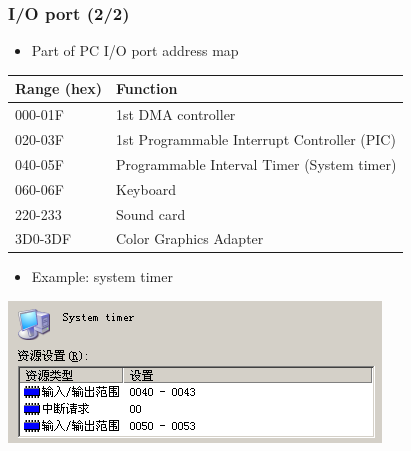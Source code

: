 \documentclass[CJKutf8,xcolor=pdftex,dvipsnames,table]{beamer}
\begin{document}
\begin{CJK*}{UTF8}{song}
  \begin{frame}
    \frametitle{I/O port (2/2)} \pause
    \begin{itemize}
    \item{Part of PC I/O port address map} \pause
    \end{itemize}
    \small
    \begin{center}
      \begin{tabular}{ll} \hline
        \textbf{Range (hex)} & \textbf{Function}\\[0.5ex] \hline\hline
        000-01F & 1st DMA controller\\ \hline
        020-03F & 1st Programmable Interrupt Controller (PIC)\\ \hline
        040-05F & Programmable Interval Timer (System timer)\\ \hline
        060-06F & Keyboard\\ \hline
        220-233 & Sound card\\ \hline
        3D0-3DF & Color Graphics Adapter\\ \hline
      \end{tabular} \pause
    \end{center}
    \normalsize
    \begin{itemize}
    \item{Example: system timer} \pause
    \end{itemize}
    \begin{center}
      \includegraphics[scale=0.5]{ioportpit}
    \end{center}
  \end{frame}


\end{CJK*}
\end{document}
